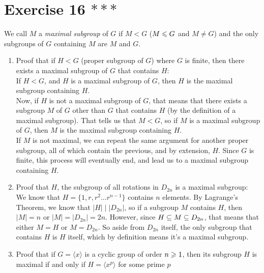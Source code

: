 \documentclass[12pt]{article}
\begin{document}
    \section*{Exercise 16 $***$}
    We call $M$ a \textit{maximal subgroup} of $G$
    if $M < G$ ($M \leqslant G$ and $M \neq G$)
    and the only subgroups of $G$ containing $M$
    are $M$ and $G$. 
    \begin{enumerate}[label=\textbf{\alph*.}]
        \item
            Proof that if $H < G$ (proper subgroup of $G$)
            where $G$ is finite,
            then there exists a maximal subgroup of $G$
            that contains $H$: \\
            If $H < G$, and $H$ is a maximal subgroup of $G$,
            then $H$ is the maximal subgroup containing $H$. \\
            Now, if $H$ is not a maximal subgroup of $G$,
            that means that there exists a subgroup
            $M$ of $G$ other than $G$ that contains $H$
            (by the definition of a maximal subgroup).
            That tells us that $M < G$, 
            so if $M$ is a maximal subgroup of $G$,
            then $M$ is the maximal subgroup containing $H$. \\
            If $M$ is not maximal, we can repeat the same argument
            for another proper subgroup,
            all of which contain the previous,
            and by extension, $H$.
            Since $G$ is finite, this process will eventually
            end, and lead us to a maximal subgroup containing $H$.
        \item
            Proof that $H$, the subgroup of all rotations in $D_{2n}$
            is a maximal subgroup: \\
            We know that $H = \{1, r, r^2 \dots r^{n-1}\}$
            contains $n$ elements.
            By Lagrange's Theorem,
            we know that $|H| \mid |D_{2n}|$,
            so if a subgroup $M$ contains $H$,
            then $|M| = n$ or $|M| = |D_{2n}| = 2n$.
            However, since $H \subseteq M \subseteq D_{2n}$,
            that means that either $M = H$ or $M = D_{2n}$.
            So aside from $D_{2n}$ itself,
            the only subgroup that contains $H$ is $H$ itself,
            which by definition means it's a maximal subgroup.
        \item
            Proof that if $G = \langle x \rangle$
            is a cyclic group of order $n \geqslant 1$,
            then its subgroup $H$ is maximal if and only if
            $H = \langle x^p \rangle$ for some prime $p$

\end{enumerate}
\end{document}
